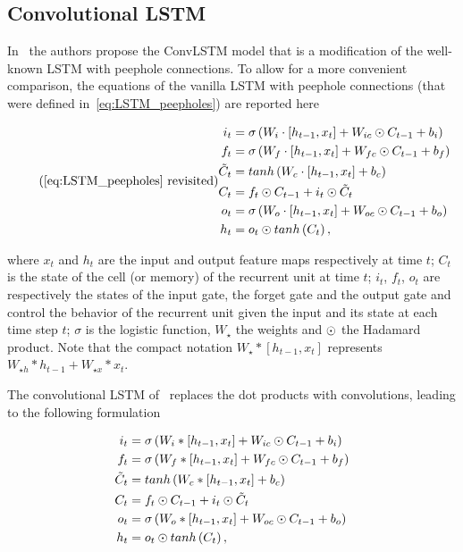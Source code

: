 \subsection{Convolutional LSTM}

In~\cite{ShiCWYWW15} the authors propose the ConvLSTM model that is a
modification of the well-known LSTM with peephole connections. To allow for a
more convenient comparison, the equations of the vanilla LSTM with peephole
connections (that were defined in~\autoref{eq:LSTM_peepholes}) are reported
here

\begin{equation*}\tag{\ref{eq:LSTM_peepholes} revisited}
\begin{split}
    i_t &= \sigma\left(W_i \cdot \left[h_{t-1}, x_t\right] +
        W_{ic} \hadamard C_{t-1} + b_i \right)\\
    f_t &= \sigma\left(W_f \cdot \left[h_{t-1}, x_t\right] +
        W_{fc} \hadamard C_{t-1} + b_f \right)\\
    \tilde C_t &= tanh \left(W_c \cdot \left[h_{t-1}, x_t\right] + b_c \right)\\
    C_t &= f_t \hadamard C_{t-1} + i_t \hadamard \tilde C_t\\
    o_t &= \sigma\left(W_o \cdot \left[h_{t-1}, x_t\right] +
        W_{oc} \hadamard C_{t-1} + b_o \right)\\
    h_t &= o_t \hadamard tanh \left(C_t\right),
\end{split}
\end{equation*}

\noindent where $x_t$ and $h_t$ are the input and output feature maps
respectively at time $t$; $C_t$ is the state of the cell (or memory) of the
recurrent unit at time $t$; $i_t$, $f_t$, $o_t$ are respectively the states of
the input gate, the forget gate and the output gate and control the behavior of
the recurrent unit given the input and its state at each time step $t$;
$\sigma$ is the logistic function, $W_{\star}$ the weights
and $\odot$ the Hadamard product. Note that the compact notation
$W_\star * [h_{t-1}, x_t]$ represents $W_{\star h} * h_{t-1} + W_{\star x} *
x_t$.

The convolutional LSTM of~\cite{ShiCWYWW15} replaces the dot products with
convolutions, leading to the following formulation

\begin{equation}
\begin{split}
    i_t &= \sigma\left(W_i * \left[h_{t-1}, x_t\right] +
        W_{ic} \odot C_{t-1} + b_i \right)\\
    f_t &= \sigma\left(W_f * \left[h_{t-1}, x_t\right] +
        W_{fc} \odot C_{t-1} + b_f \right)\\
    \tilde C_t &= tanh \left(W_c * \left[h_{t-1}, x_t\right] + b_c \right)\\
    C_t &= f_t \odot C_{t-1} + i_t \odot \tilde C_t\\
    o_t &= \sigma\left(W_o * \left[h_{t-1}, x_t\right] +
        W_{oc} \odot C_{t-1} + b_o \right)\\
    h_t &= o_t \odot tanh \left(C_t\right),
\end{split}
\end{equation}

